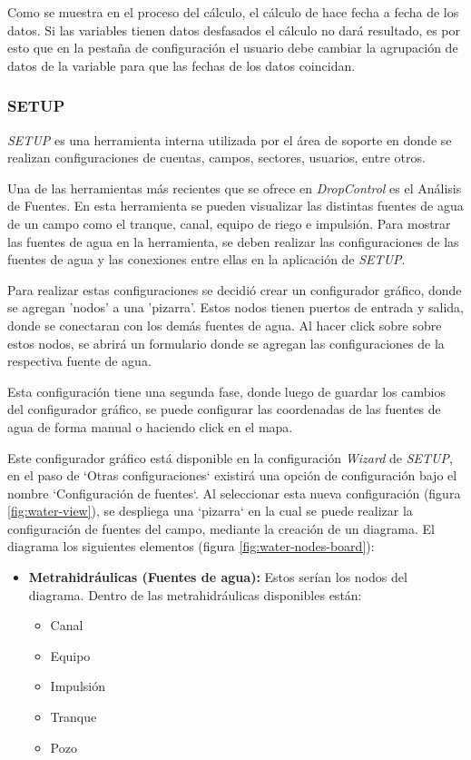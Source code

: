 Como se muestra en el proceso del cálculo, el cálculo de hace fecha a fecha de los datos. Si las variables tienen datos desfasados el cálculo no dará resultado, es por esto que en la pestaña de configuración el usuario debe cambiar la agrupación de datos de la variable para que las fechas de los datos coincidan.

\iffalse
\subsubsection{SETUP}

\textit{SETUP} es una herramienta interna utilizada por el área de soporte en donde se realizan configuraciones de cuentas, campos, sectores, usuarios, entre otros.


Una de las herramientas más recientes que se ofrece en \textit{DropControl} es el Análisis de Fuentes. En esta herramienta se pueden visualizar las distintas fuentes de agua de un campo como el tranque, canal, equipo de riego e impulsión.
Para mostrar las fuentes de agua en la herramienta, se deben realizar las configuraciones de las fuentes de agua y las conexiones entre ellas en la aplicación de \textit{SETUP}.

Para realizar estas configuraciones se decidió crear un configurador gráfico, donde se agregan 'nodos' a una 'pizarra'. Estos nodos tienen puertos de entrada y salida, donde se conectaran con los demás fuentes de agua. Al hacer click sobre sobre estos nodos, se abrirá un formulario donde se agregan las configuraciones de la respectiva fuente de agua.

Esta configuración tiene una segunda fase, donde luego de guardar los cambios del configurador gráfico, se puede configurar las coordenadas de las fuentes de agua de forma manual o haciendo click en el mapa.

Este configurador gráfico está disponible en la configuración \textit{Wizard} de \textit{SETUP}, en el paso de `Otras configuraciones` existirá una opción de configuración bajo el nombre `Configuración de fuentes`.
Al seleccionar esta nueva configuración (figura \ref{fig:water-view}), se despliega una `pizarra` en la cual se puede realizar la configuración de fuentes del campo, mediante la creación de un diagrama. El diagrama los siguientes elementos (figura \ref{fig:water-nodes-board}):
\begin{itemize}
    \item \textbf{Metrahidráulicas (Fuentes de agua):} Estos serían los nodos del diagrama. Dentro de las metrahidráulicas disponibles están:
          \begin{itemize}
              \item Canal
              \item Equipo
              \item Impulsión
              \item Tranque
              \item Pozo
          \end{itemize}   
\end{itemize}

